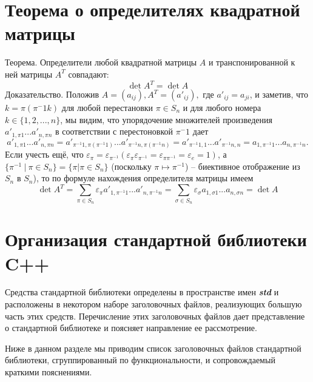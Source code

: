 \documentclass[a4paper, 12pt]{article} %
\begin{document}
\section*{Теорема о определителях квадратной матрицы}
Теорема. Определители любой квадратной матрицы $A$ и транспонированной к ней матрицы $A^T$ совпадают:
\begin{equation}
    \det A^T = \det A
\end{equation}
Доказательство. Положив $A = (a_{ij}), A^T = (a'_{ij}),$ где $a'_{ij} = a_{ji}$, и заметив, что $k = \pi(\pi^-1 k)$ для любой перестановки $\pi \in S_n$ и для любого номера $k \in \{1,2,...,n\}$, мы видим, что упорядочение множителей произведения $a'_{1,\pi 1} ... a'_{n,\pi n}$ в соответствии с перестоновкой $\pi^-1$ дает
\begin{equation}
    a'_{1,\pi 1} ... a'_{n,\pi n} = a'_{\pi^{-1} 1, \pi(\pi^{-1} 1)} ... a'_{\pi^{-1} n, \pi(\pi^{-1} n)} = a'_{\pi^{-1} 1, 1} ... a'_{\pi^{-1} n, n} = a_{1, \pi^{-1} 1} ... a_{n, \pi^{-1} n}.
\end{equation}
Если учесть ещё, что $\varepsilon_\pi = \varepsilon_{\pi^{-1}} (\varepsilon_\pi \varepsilon_{\pi^{-1}} = \varepsilon_{\pi \pi^{-1}} = \varepsilon_e = 1)$, а $\{\pi^{-1} \ | \ \pi \in S_n\} = \{\pi | \pi \in S_n\}$ (поскольку $\pi \mapsto \pi^{-1}$) -- биективное отображение из $S_n$ в $S_n$), то по формуле нахождения определителя матрицы имеем
\begin{equation}
    \det A^T = \sum_{\pi \in S_n} \varepsilon_\pi a'_{1, \pi^{-1} 1} ... a'_{n, \pi^{-1} n} = \sum_{\sigma \in S_n} \varepsilon_\sigma a_{1, \sigma 1} ... a_{n, \sigma n} = \det A
\end{equation}

\clearpage
\section*{Организация стандартной библиотеки C++}
Средства стандартной библиотеки определены в пространстве имен \textbf{\textit{std}} и расположены в некотором наборе заголовочных файлов, реализующих большую часть этих средств. Перечисление этих заголовочных файлов дает представление о стандартной библиотеке и поясняет направление ее рассмотрение.

Ниже в данном разделе мы приводим список заголовочных файлов стандартной библиотеки, сгруппированный по функциональности, и сопровождаемый краткими пояснениями.
\end{document}
